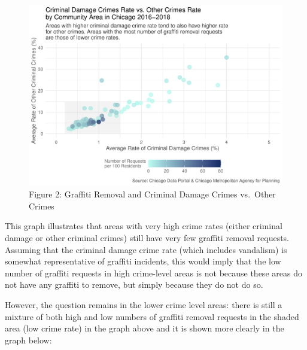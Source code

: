 \documentclass[
]{report}
\begin{document}
\begin{figure}[H]

\caption{Figure 2: Graffiti Removal and Criminal Damage Crimes vs.~Other
Crimes}

{\centering \includegraphics{final_solo_files/figure-pdf/unnamed-chunk-3-1.pdf}

}

\end{figure}

This graph illustrates that areas with very high crime rates (either
criminal damage or other criminal crimes) still have very few graffiti
removal requests. Assuming that the criminal damage crime rate (which
includes vandalism) is somewhat representative of graffiti incidents,
this would imply that the low number of graffiti requests in high
crime-level areas is not because these areas do not have any graffiti to
remove, but simply because they do not do so.

However, the question remains in the lower crime level areas: there is
still a mixture of both high and low numbers of graffiti removal
requests in the shaded area (low crime rate) in the graph above and it
is shown more clearly in the graph below:
\end{document}
